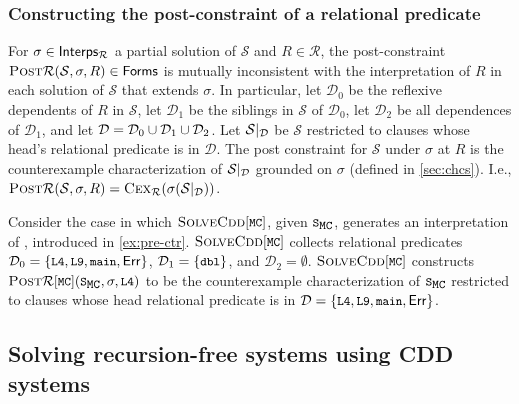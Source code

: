 \subsubsection{Constructing the post-constraint of a relational
  predicate}
\label{sec:cons-ctx}
%
For $\sigma \in \mathsf{Interps_{  \mathcal{R}  }}$ a partial solution of
$\mathcal{S}$ and $R \in \mathcal{R}$, the post-constraint $\textsc{Post}{
  \mathcal{R} }(\mathcal{S}, \sigma, R) \in \mathsf{Forms}$ is mutually
inconsistent with the interpretation of $R$ in each solution of
$\mathcal{S}$ that extends $\sigma$.
In particular, let $\mathcal{D}_0$ be the reflexive dependents of $R$
in $\mathcal{S}$,
let $\mathcal{D}_1$ be the siblings in $\mathcal{S}$ of
$\mathcal{D}_0$,
%
let $\mathcal{D}_2$ be all dependences of $\mathcal{D}_1$, and
let $\mathcal{D} = \mathcal{D}_0 \cup \mathcal{D}_1 \cup
\mathcal{D}_2$.
Let $\mathcal{S} |_{ \mathcal{D} }$ be $\mathcal{S}$
restricted to clauses whose head's relational predicate is in
$\mathcal{D}$.
The post constraint for $\mathcal{S}$ under $\sigma$ at $R$ is the
counterexample characterization of $\mathcal{S} |_{
  \mathcal{D} }$ grounded on $\sigma$ (defined in \autoref{sec:chcs}).
%
I.e., $\textsc{Post}{ \mathcal{R} }(\mathcal{S}, \sigma, R) = \textsc{Cex}_{
  \mathcal{R} }(\sigma( \mathcal{S} |_{ \mathcal{D} }))$.
\begin{ex}
  \label{ex:ctx-ctr}
  Consider the case in which $\mcsolve$, given $\mcchc$, generates an
  interpretation of , introduced in \autoref{ex:pre-ctr}.
  $\mcsolve$ collects relational predicates $\mathcal{D}_0 = \elts{
    \cc{L4}, \cc{L9}, \cc{main}, \mathsf{Err} }$, $\mathcal{D}_1 =
  \elts{ \cc{dbl} }$, and $\mathcal{D}_2 = \emptyset$.
  $\mcsolve$ constructs $\postctr{ \mcpreds }(\mcchc, \sigma,
  \cc{L4})$ to be the counterexample characterization of $\mcchc$
  restricted to clauses whose head relational predicate is in
  $\mathcal{D} = \elts{ \cc{L4}, \cc{L9}, \cc{main}, \mathsf{Err} }$.
\end{ex}

\subsection{Solving recursion-free systems using CDD systems}
\label{sec:core-solver}

